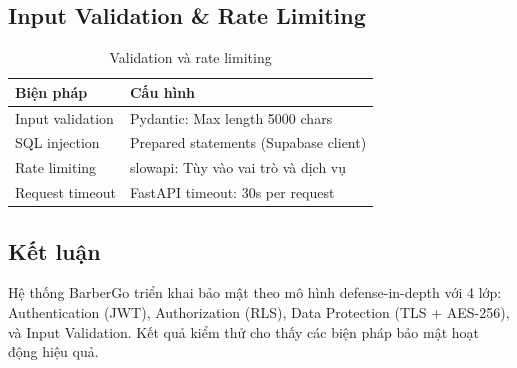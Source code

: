 \subsection{Input Validation \& Rate Limiting}

\begin{table}[H]
\centering
\caption{Validation và rate limiting}
\begin{tabular}{|l|l|}
\hline
\textbf{Biện pháp} & \textbf{Cấu hình} \\
\hline
Input validation & Pydantic: Max length 5000 chars \\
\hline
SQL injection & Prepared statements (Supabase client) \\
\hline
Rate limiting & slowapi: Tùy vào vai trò và dịch vụ \\
\hline
Request timeout & FastAPI timeout: 30s per request \\
\hline
\end{tabular}
\end{table}

\subsection{Kết luận}

Hệ thống BarberGo triển khai bảo mật theo mô hình defense-in-depth với 4 lớp: 
Authentication (JWT), Authorization (RLS), Data Protection (TLS + AES-256), 
và Input Validation. Kết quả kiểm thử cho thấy các biện pháp bảo mật hoạt động hiệu quả.